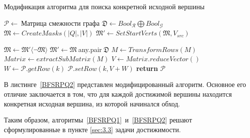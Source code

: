 \begin{algorithm}[t]
  \caption{Модификация алгоритма для поиска конкретной исходной вершины}\label{BFSRPQ2}
  \begin{algorithmic}[1]
    \State $\mathcal{P}\gets~${Матрица смежности графа}
    \State $\mathfrak{D}\gets Bool_\mathcal{R} \bigoplus Bool_\mathcal{G}$
    \State $\mathfrak{M}\gets CreateMasks(|Q|,|V|)$
    \State $\mathfrak{M}'\gets SetStartVerts(\mathfrak{M}, V_{src})$  
    
      \State $\mathfrak{M}\gets \mathfrak{M}'\langle\neg\mathfrak{M}\rangle$
        \State $\mathfrak{M}'\gets \mathfrak{M}~$any.pair$~\mathfrak{D}$
            \State $M\gets TransformRows(M)$
        \EndFor
      \EndFor
        \State $Matrix\gets extractSubMatrix(M)$
        \State $V\gets Matrix.reduceVector()$
        \State $W\gets\mathcal{P}.getRow(k)$
        \State $\mathcal{P}.setRow(k, V+W)$
      \EndFor
    \EndWhile
    \State \textbf{return} $\mathcal{P}$
    \EndProcedure
  \end{algorithmic}
\end{algorithm}

В листинге~\ref{BFSRPQ2} представлен модифицированный алгоритм. Основное его отличие заключается в том, что для каждой достижимой вершины находится конкретная исходная вершина, из которой начинался обход.

Таким образом, алгоритмы~\ref{BFSRPQ1}~и~\ref{BFSRPQ2} решают сформулированные в пункте \ref{sec:3.3} задачи достижимости.